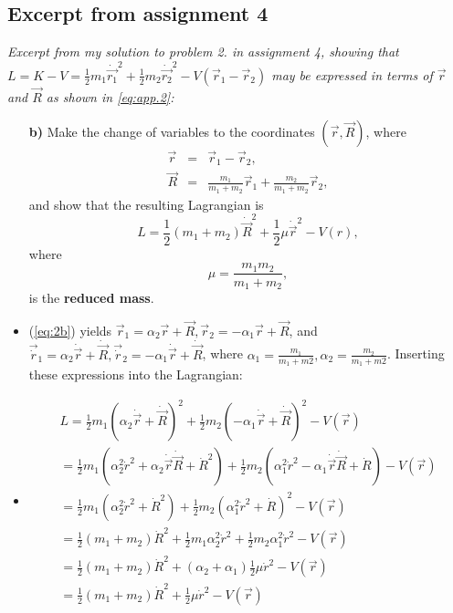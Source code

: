 \documentclass[11pt,a4paper]{report}
\begin{document}
\subsection*{Excerpt from assignment 4}
\textit{Excerpt from my solution to problem 2. in assignment 4, showing that $L=K-V=\frac{1}{2}m_1 \dot{\vec{r_1}}^2+\frac{1}{2}m_2\dot{\vec{r_2}}^2-V(\vec{r}_1-\vec{r}_2)$ may be expressed in terms of $\vec{r}$ and $\vec{R}$ as shown in \eqref{eq:app.2}:}
\begin{itemize}
\item[\bf b)] Make the change of variables to the coordinates $(\vec r, \vec R)$, where
\begin{eqnarray}
{\vec r} &=& {\vec r}_1 -{\vec r}_2,\\
{\vec R} &=& \frac{m_1}{m_1+ m_2}{\vec r}_1 + \frac{m_2}{m_1+ m_2}{\vec r}_2, 
\label{eq:2b}
\end{eqnarray}
and show that the resulting Lagrangian is
\begin{equation}
L= \frac{1}{2}(m_1+m_2)\dot{\vec R}^2+ \frac{1}{2}\mu\dot{\vec r}^2-V(r),\label{eq:app.2}
\end{equation}
where
\begin{equation}
\mu=\frac{m_1m_2}{m_1+ m_2},
\end{equation}
is the {\bf reduced mass}.

\item (\ref{eq:2b}) yields $\vec{r}_1=\alpha_2\vec{r}+\vec{R}, \vec{r}_2=-\alpha_1\vec{r}+\vec{R}$, and $\vec{\dot{r}}_1=\alpha_2\dot{\vec{r}}+\dot{\vec{R}}, \vec{\dot{r}}_2=-\alpha_1\dot{\vec{r}}+\dot{\vec{R}}$,  where 
$\alpha_1=\frac{m_1}{m_1+m2}, \alpha_2= \frac{m_2}{m_1+m2}$. Inserting these expressions into the Lagrangian: 
\item \begin{align*}
L=\frac{1}{2}m_1 (\alpha_2\dot{\vec{r}}+\dot{\vec{R}})^2+\frac{1}{2}m_2 (-\alpha_1\dot{\vec{r}}+\dot{\vec{R}})^2 -V(\vec{r}) \\
=\frac{1}{2}m_1 (\alpha_2^2 \dot{r}^2+\alpha_2\dot{\vec{r}}\dot{\vec{R}}+\dot{R}^2)+\frac{1}{2}m_2 (\alpha_1^2\dot{r}^2-\alpha_1\dot{\vec{r}}\dot{\vec{R}}+\dot{R}) -V(\vec{r})\\
=\frac{1}{2}m_1 (\alpha_2^2 \dot{r}^2+\dot{R}^2)+\frac{1}{2}m_2 (\alpha_1^2\dot{r}^2+\dot{R})^2 -V(\vec{r})\\
=\frac{1}{2}(m_1+m_2)\dot{R}^2 +\frac{1}{2}m_1\alpha_2^2 \dot{r}^2+\frac{1}{2}m_2 \alpha_1^2\dot{r}^2 -V(\vec{r})\\
=\frac{1}{2}(m_1+m_2)\dot{R}^2 +(\alpha_2+\alpha_1)\frac{1}{2} \mu \dot{r}^2 -V(\vec{r})\\
=\frac{1}{2}(m_1+m_2)\dot{R}^2 +\frac{1}{2} \mu \dot{r}^2 -V(\vec{r})
\end{align*}
\end{itemize}
\end{document}
